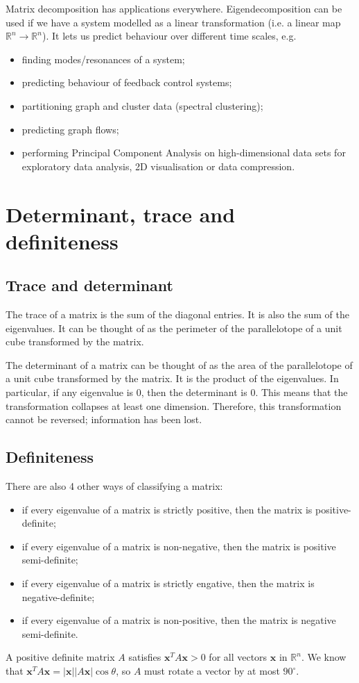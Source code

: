 \documentclass[a4paper, openany]{memoir}
\begin{document}
    Matrix decomposition has applications everywhere. Eigendecomposition can be used if we have a system modelled as a linear transformation (i.e. a linear map $\mathbb{R}^n \to \mathbb{R}^n$). It lets us predict behaviour over different time scales, e.g.
    \begin{itemize}
        \item finding modes/resonances of a system;
        \item predicting behaviour of feedback control systems;
        \item partitioning graph and cluster data (spectral clustering);
        \item predicting graph flows;
        \item performing Principal Component Analysis on high-dimensional data sets for exploratory data analysis, 2D visualisation or data compression.
    \end{itemize}

    \section{Determinant, trace and definiteness}
    \subsection{Trace and determinant}
    The trace of a matrix is the sum of the diagonal entries. It is also the sum of the eigenvalues. It can be thought of as the perimeter of the parallelotope of a unit cube transformed by the matrix.

    The determinant of a matrix can be thought of as the area of the parallelotope of a unit cube transformed by the matrix. It is the product of the eigenvalues. In particular, if any eigenvalue is 0, then the determinant is 0. This means that the transformation collapses at least one dimension. Therefore, this transformation cannot be reversed; information has been lost.

    \subsection{Definiteness}
    There are also 4 other ways of classifying a matrix:
    \begin{itemize}
        \item if every eigenvalue of a matrix is strictly positive, then the matrix is positive-definite;
        \item if every eigenvalue of a matrix is non-negative, then the matrix is positive semi-definite;
        \item if every eigenvalue of a matrix is strictly engative, then the matrix is negative-definite;
        \item if every eigenvalue of a matrix is non-positive, then the matrix is negative semi-definite.
    \end{itemize}
    A positive definite matrix $A$ satisfies $\mathbf{x}^T A \mathbf{x} > 0$ for all vectors $\mathbf{x}$ in $\mathbb{R}^n$. We know that $\mathbf{x}^T A \mathbf{x} = |\mathbf{x}| |A \mathbf{x}| \cos \theta$, so $A$ must rotate a vector by at most $90^{\circ}$.
\end{document}
